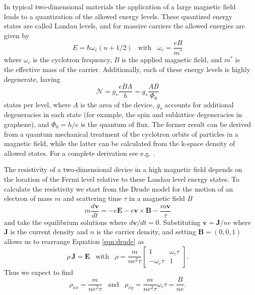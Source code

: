 \documentclass[edeposit,fullpage,draftthesis]{uiucthesis2009}
\begin{document}
        In typical two-dimensional materials the application of a large magnetic 
        field leads to a quantization of the allowed energy levels. These quantized energy states are 
        called Landau levels, and for massive carriers the allowed energies are given by
        \begin{equation}
            E=\hbar \omega_c (n + 1/2) \;\;\; \text{with} \;\;\; \omega_c = \frac{e B}{m^*}
        \end{equation}
        where $\omega_c$ is the cyclotron frequency, $B$ is the applied magnetic field,
        and $m^*$ is the effective mass of the carrier.
        Additionally, each of these energy levels is highly degenerate, having
        \begin{equation}
            \mathcal{N} = g_s \frac{e B A}{h} = g_s \frac{A B}{\Phi_0}
            \label{eqn:ll_degeneracy}
        \end{equation}
        states per level, where $A$ is the area of the device,
        $g_s$ accounts for additional degeneracies in each state (for example,
        the spin and sublattice degeneracies in graphene),
        and $\Phi_0 = h / e$ is the quantum of flux. 
        The former result 
        can be derived from a quantum mechanical treatment of the cyclotron orbits of particles in a magnetic field,
        while the latter can be calculated from the k-space density of allowed states. For a complete
        derivation see e.g. \cite{kittel1966introduction}.
        
        The resistivity of a two-dimensional device in a high magnetic field depends on the location of the Fermi level
        relative to these Landau level energy states. To calculate the resistivity we start from the Drude model 
        for the motion of an electron of mass $m$ and scattering time $\tau$ in a magnetic field $B$
        \begin{equation}
            m \frac{d \mathbf{v}}{dt} = -e \mathbf{E} - e \mathbf{v} \times \mathbf{B} - \frac{m \mathbf{v}}{\tau}
            \label{eqn:drude}
        \end{equation}
        and take the equilibrium solutions where $d \mathbf{v}/dt = 0$. Substituting $\mathbf{v} = \mathbf{J} / n e$
        where $\mathbf{J}$ is the current density and $n$ is the carrier density, and setting $\mathbf{B} = (0,0,1)$
        allows us to rearrange Equation \ref{eqn:drude} as
        \begin{equation}
            \rho \, \mathbf{J} = \mathbf{E} \;\;\; \text{with} \;\;\; \rho = \frac{m}{n e^2 \tau} \begin{bmatrix} 1 & \omega_c \tau \\ - \omega_c \tau & 1 \end{bmatrix}.     
            \label{eqn:rho}
        \end{equation}
        Thus we expect to find
        \begin{equation}
            \rho_{xx} = \frac{m}{n e^2 \tau} \;\;\; \text{and} \;\;\; \rho_{xy} = \frac{m}{n e^2 \tau} \omega_c \tau = \frac{B}{n e}.
        \end{equation}
        
\end{document}
